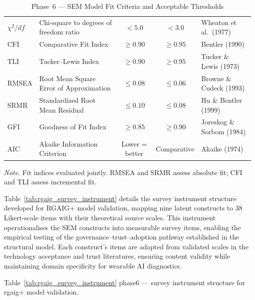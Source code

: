\begin{xltabular}{\textwidth}{@{} l X c c X @{}}
\caption{Phase~6 --- SEM Model Fit Criteria and Acceptable Thresholds}
\label{tab:rgaig_sem_fit_criteria}\\
\toprule
{} &  &  &  &  \\
\midrule
\endfirsthead
\endhead
\bottomrule
\endlastfoot
$\chi^2/df$ & Chi-square to degrees of freedom ratio & $< 5.0$ & $< 3.0$ & Wheaton et al.\ (1977) \\
\addlinespace
CFI & Comparative Fit Index & $\geq 0.90$ & $\geq 0.95$ & Bentler (1990) \\
\addlinespace
TLI & Tucker--Lewis Index & $\geq 0.90$ & $\geq 0.95$ & Tucker \& Lewis (1973) \\
\addlinespace
RMSEA & Root Mean Square Error of Approximation & $\leq 0.08$ & $\leq 0.06$ & Browne \& Cudeck (1993) \\
\addlinespace
SRMR & Standardized Root Mean Residual & $\leq 0.10$ & $\leq 0.08$ & Hu \& Bentler (1999) \\
\addlinespace
GFI & Goodness of Fit Index & $\geq 0.85$ & $\geq 0.90$ & Joreskog \& Sorbom (1984) \\
\addlinespace
AIC & Akaike Information Criterion & Lower = better & Comparative & Akaike (1974) \\
\end{xltabular}
\par\smallskip\noindent\textit{Note.} Fit indices evaluated jointly. RMSEA and SRMR assess absolute fit; CFI and TLI assess incremental fit.
\endgroup

\vspace{1.5em}

Table~\ref{tab:rgaig_survey_instrument} details the survey instrument structure developed for RGAIG+ model validation, mapping nine latent constructs to 38 Likert-scale items with their theoretical source scales. This instrument operationalises the SEM constructs into measurable survey items, enabling the empirical testing of the governance--trust--adoption pathway established in the structural model. Each construct's items are adapted from validated scales in the technology acceptance and trust literatures, ensuring content validity while maintaining domain specificity for wearable AI diagnostics.

\begingroup\singlespacing\tablefontsize\tablestripes
\noindent Table~\ref{tab:rgaig_survey_instrument} phase6 --- survey instrument structure for rgaig+ model validation.

